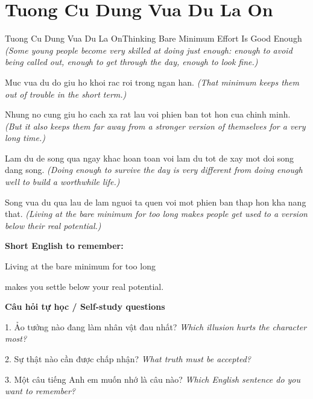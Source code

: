 \section{Tuong Cu Dung Vua Du La On}
\begin{truyen}{Tuong Cu Dung Vua Du La On}{Thinking Bare Minimum Effort Is Good Enough}
\textit{(Some young people become very skilled at doing just enough: enough to avoid being called out, enough to get through the day, enough to look fine.)}

Muc vua du do giu ho khoi rac roi trong ngan han.
\textit{(That minimum keeps them out of trouble in the short term.)}

Nhung no cung giu ho cach xa rat lau voi phien ban tot hon cua chinh minh.
\textit{(But it also keeps them far away from a stronger version of themselves for a very long time.)}

Lam du de song qua ngay khac hoan toan voi lam du tot de xay mot doi song dang song.
\textit{(Doing enough to survive the day is very different from doing enough well to build a worthwhile life.)}

\end{truyen}

\begin{baihoc}
Song vua du qua lau de lam nguoi ta quen voi mot phien ban thap hon kha nang that.
\textit{(Living at the bare minimum for too long makes people get used to a version below their real potential.)}
\end{baihoc}

\begin{ghinhoanh}
\textbf{Short English to remember:}

Living at the bare minimum for too long

makes you settle below your real potential.

\end{ghinhoanh}

\begin{tuhocnhanh}
\textbf{Câu hỏi tự học / Self-study questions}

1. Ảo tưởng nào đang làm nhân vật đau nhất? \textit{Which illusion hurts the character most?}

2. Sự thật nào cần được chấp nhận? \textit{What truth must be accepted?}

3. Một câu tiếng Anh em muốn nhớ là câu nào? \textit{Which English sentence do you want to remember?}
\end{tuhocnhanh}
\ngancach

